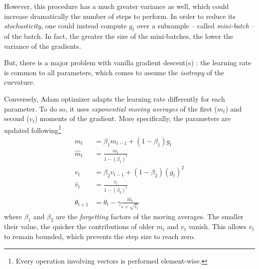 \documentclass[twocolumn,superscriptaddress,aps,nofootinbib]{revtex4-1}
\begin{document}
However, this procedure has a much greater variance as well, which could increase dramatically the number of steps to perform. In order to reduce its \emph{stochasticity}, one could instead compute $g_t$ over a subsample -- called \emph{mini-batch} -- of the batch. In fact, the greater the size of the mini-batches, the lower the variance of the gradients.


But, there is a major problem with vanilla gradient descent(s) : the learning rate is common to all parameters, which comes to assume the \emph{isotropy} of the curvature.

Conversely, Adam optimizer adapts the learning rate differently for each parameter. To do so, it uses \emph{exponential moving averages} of the first ($m_t$) and second ($v_t$) moments of the gradient. More specifically, the parameters are updated following\footnote{Every operation involving vectors is performed element-wise.}
\begin{subequations}
    \begin{align}
        m_{t} & = \beta_{1} m_{t-1} + \left(1 - \beta_{1}\right) g_{t} \label{subeq:adam_1} \\
        \hat{m}_{t} & = \frac{m_{t}}{1 - (\beta_{1})^{t}} \label{subeq:adam_2} \\
        v_{t} &=\beta_{2} v_{t-1} + \left(1 - \beta_{2}\right) (g_{t})^2 \label{subeq:adam_3} \\
        \hat{v}_{t} & = \frac{v_{t}}{1 - (\beta_{2})^{t}} \label{subeq:adam_4} \\
        \theta_{t+1} & = \theta_{t} - \gamma \frac{\hat{m}_{t}}{\epsilon + \sqrt{\hat{v}_{t}}} \label{subeq:adam_5}
    \end{align}
\end{subequations}
where $\beta_1$ and $\beta_2$ are the \emph{forgetting} factors of the moving averages. The smaller their value, the quicker the contributions of older $m_{t}$ and $v_{t}$ vanish. This allows $v_{t}$ to remain bounded, which prevents the step size to reach zero.
\end{document}
